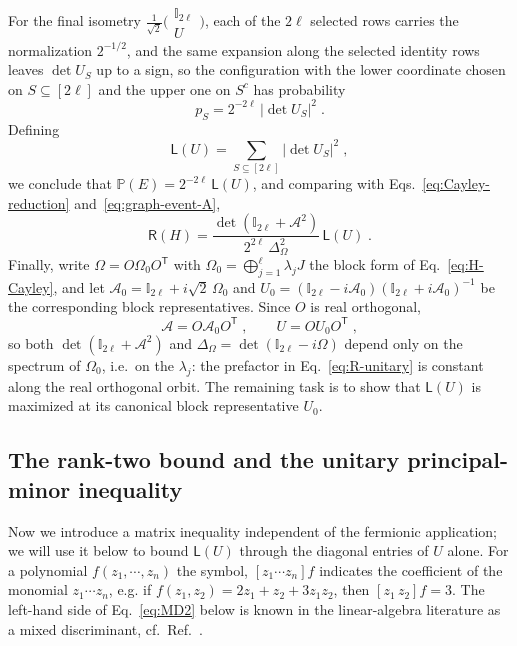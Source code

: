 \documentclass[aps,prl,twocolumn,superscriptaddress,reprint,longbibliography,nofootinbib]{revtex4-2}
\newcommand{\trans}{\mathsf{T}}
\begin{document}
For the final isometry $\frac{1}{\sqrt2}\big(\begin{smallmatrix}\mathbb{I}_{2\ell}\\ U\end{smallmatrix}\big)$, each of the $2\ell$ selected rows carries the normalization $2^{-1/2}$, and the same expansion along the selected identity rows leaves $\det U_S$ up to a sign, so the configuration with the lower coordinate chosen on $S\subseteq[2\ell]$ and the upper one on $S^c$ has probability
\begin{equation}
    p_S=2^{-2\ell}\,|\det U_S|^2\;.
\end{equation}
Defining
\begin{equation}
    \mathsf{L}(U)=\sum_{S\subseteq[2\ell]}|\det U_S|^2\;,
    \label{eq:L-definition}
    \end{equation}
we conclude that $\mathbb{P}(E)=2^{-2\ell}\,\mathsf{L}(U)$, and comparing with Eqs.~\eqref{eq:Cayley-reduction} and~\eqref{eq:graph-event-A},
\begin{equation}
    \mathsf{R}(H)=\frac{\det(\mathbb{I}_{2\ell}+\mathcal{A}^2)}{2^{2\ell}\,\Delta_\Omega^2}\,\mathsf{L}(U)\;.
    \label{eq:R-unitary}
\end{equation}
Finally, write $\Omega=O\Omega_0O^{\trans}$ with $\Omega_0=\bigoplus_{j=1}^{\ell}\lambda_jJ$ the block form of Eq.~\eqref{eq:H-Cayley}, and let $\mathcal{A}_0=\mathbb{I}_{2\ell}+i\sqrt2\,\Omega_0$ and $U_0=(\mathbb{I}_{2\ell}-i\mathcal{A}_0)(\mathbb{I}_{2\ell}+i\mathcal{A}_0)^{-1}$ be the corresponding block representatives. Since $O$ is real orthogonal,
\begin{equation}
    \mathcal{A}=O\mathcal{A}_0O^{\trans}\;,\qquad U=OU_0O^{\trans}\;,
\end{equation}
so both $\det(\mathbb{I}_{2\ell}+\mathcal{A}^2)$ and $\Delta_\Omega=\det(\mathbb{I}_{2\ell}-i\Omega)$ depend only on the spectrum of $\Omega_0$, i.e.\ on the $\lambda_j$: the prefactor in Eq.~\eqref{eq:R-unitary} is constant along the real orthogonal orbit. The remaining task is to show that $\mathsf{L}(U)$ is maximized at its canonical block representative $U_0$.

\subsection{ The rank-two bound and the unitary principal-minor inequality}
\label{app:proof:MD2}

Now we introduce a matrix inequality independent of the fermionic application; we will use it below to bound $\mathsf{L}(U)$ through the diagonal entries of $U$ alone. 
For a polynomial $f(z_1, \cdots,z_n)$ the symbol, $[z_1\cdots z_n]f$ indicates the coefficient of the monomial $z_1\cdots z_n$, e.g. if $f(z_1,z_2)=2z_1+z_2+3 z_1z_2$, then $[z_1 \, z_2]f=3$.
The left-hand side of Eq.~\eqref{eq:MD2} below is known in the linear-algebra literature as a mixed discriminant, cf.\ Ref.~\cite{Bapat1989}.
\end{document}
